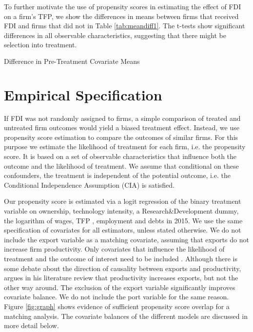 \documentclass[a4paper,11pt]{scrartcl}
\begin{document}
To further motivate the use of propensity scores in estimating the effect of FDI on a firm's TFP, we show the differences in means between  firms that received FDI and firms that did not in Table \ref{tab:meandiff1}. The t-tests show significant differences in all observable characteristics, suggesting that there might be selection into treatment. 


\begin{table}[h!]
	\centering
	\caption{Difference in Pre-Treatment Covariate Means}
	\makebox[\textwidth]{
	}
	\label{tab:meandiff1}
\end{table}


\section{Empirical Specification}

If FDI was not randomly assigned to firms, a simple comparison of treated and untreated firm outcomes would yield a biased treatment effect.
Instead, we use propensity score estimation to compare the outcomes of similar firms. For this purpose we estimate the likelihood of treatment for each firm, i.e. the propensity score. It is based on a set of observable characteristics that influence both the outcome and the likelihood of treatment. We assume that conditional on these confounders, the treatment is independent of the potential outcome, i.e. the Conditional Independence Assumption (CIA) is satisfied. 

Our propensity score is estimated via a logit regression of the binary treatment variable on ownership, technology intensity, a Research\&Development dummy, the logarithm of wages, TFP , employment and debts in 2015. We use the same specification of covariates for all estimators, unless stated otherwise. We do not include the export variable as a matching covariate, assuming that exports do not increase firm productivity.
Only covariates that influence the likelihood of treatment and the outcome of interest need to be included \citep{Caliendo08}.
Although there is some debate about the direction of causality between exports and productivity, \citet{wagner2007} argues in his literature review that productivity increases exports, but not the other way around. The exclusion of the export variable significantly improves covariate balance. We do not include the port variable for the same reason.
Figure \ref{fig:graph} shows evidence of sufficient propensity score overlap for a matching analysis. The covariate balances of the different models are discussed in more detail below.
\end{document}
